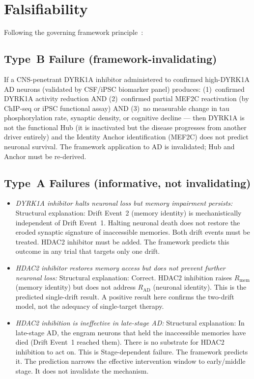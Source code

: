 \documentclass[12pt,a4paper]{article}
\newcommand{\RAD}{R_{\mathrm{AD}}}
\newcommand{\RMEM}{R_{\mathrm{mem}}}
\begin{document}
\section{Falsifiability}

Following the governing framework
principle~\cite{FalsThm2026}:

\subsection{Type~B Failure (framework-invalidating)}

If a CNS-penetrant DYRK1A inhibitor administered to
confirmed high-DYRK1A AD neurons (validated by
CSF/iPSC biomarker panel) produces: (1)~confirmed
DYRK1A activity reduction AND (2)~confirmed partial
MEF2C reactivation (by ChIP-seq or iPSC functional assay)
AND (3)~no measurable change in tau phosphorylation
rate, synaptic density, or cognitive decline ---
then DYRK1A is not the functional Hub (it is inactivated
but the disease progresses from another driver entirely)
and the Identity Anchor identification (MEF2C) does
not predict neuronal survival. The framework
application to AD is invalidated; Hub and Anchor
must be re-derived.

\subsection{Type~A Failures (informative, not
invalidating)}

\begin{itemize}
  \item \textit{DYRK1A inhibitor halts neuronal loss
    but memory impairment persists:}
    Structural explanation: Drift Event~2 (memory
    identity) is mechanistically independent of
    Drift Event~1. Halting neuronal death does not
    restore the eroded synaptic signature of
    inaccessible memories. Both drift events must
    be treated. HDAC2 inhibitor must be added.
    The framework predicts this outcome in any
    trial that targets only one drift.

  \item \textit{HDAC2 inhibitor restores memory access
    but does not prevent further neuronal loss:}
    Structural explanation: Correct. HDAC2 inhibition
    raises $\RMEM$ (memory identity) but does not
    address $\RAD$ (neuronal identity). This is the
    predicted single-drift result. A positive result
    here confirms the two-drift model, not the
    adequacy of single-target therapy.

  \item \textit{HDAC2 inhibition is ineffective in
    late-stage AD:}
    Structural explanation: In late-stage AD, the
    engram neurons that held the inaccessible memories
    have died (Drift Event~1 reached them). There is
    no substrate for HDAC2 inhibition to act on.
    This is Stage-dependent failure. The framework
    predicts it. The prediction narrows the effective
    intervention window to early/middle stage. It
    does not invalidate the mechanism.
\end{itemize}
\end{document}

